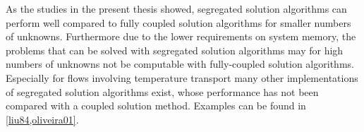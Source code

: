 As the studies in the present thesis showed, segregated solution algorithms can perform well compared to fully coupled solution algorithms for smaller numbers of unknowns. Furthermore due to the lower requirements on system memory, the problems that can be solved with segregated solution algorithms may for high numbers of unknowns not be computable with fully-coupled solution algorithms. Especially for flows involving temperature transport many other implementations of segregated solution algorithms exist, whose performance has not been compared with a coupled solution method. Examples can be found in \ref{liu84,oliveira01}.


